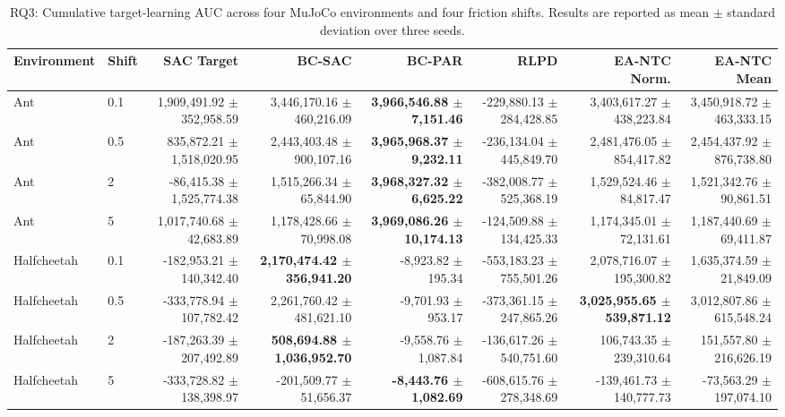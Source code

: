 \begin{table}[htbp]
\centering
\caption{RQ3: Cumulative target-learning AUC across four MuJoCo environments and four friction shifts. Results are reported as mean $\pm$ standard deviation over three seeds.}
\label{tab:rq3_absolute_auc}
\scriptsize
\setlength{\tabcolsep}{3pt}
\renewcommand{\arraystretch}{1.15}
\begin{adjustbox}{max width=\textwidth}
\begin{tabular}{llrrrrrr}
\toprule
\textbf{Environment} & \textbf{Shift} & \textbf{SAC Target} & \textbf{BC-SAC} & \textbf{BC-PAR} & \textbf{RLPD} & \textbf{EA-NTC Norm.} & \textbf{EA-NTC Mean} \\
\midrule
Ant & 0.1 & 1,909,491.92 $\pm$ 352,958.59 & 3,446,170.16 $\pm$ 460,216.09 & \textbf{3,966,546.88 $\pm$ 7,151.46} & -229,880.13 $\pm$ 284,428.85 & 3,403,617.27 $\pm$ 438,223.84 & 3,450,918.72 $\pm$ 463,333.15 \\
Ant & 0.5 & 835,872.21 $\pm$ 1,518,020.95 & 2,443,403.48 $\pm$ 900,107.16 & \textbf{3,965,968.37 $\pm$ 9,232.11} & -236,134.04 $\pm$ 445,849.70 & 2,481,476.05 $\pm$ 854,417.82 & 2,454,437.92 $\pm$ 876,738.80 \\
Ant & 2 & -86,415.38 $\pm$ 1,525,774.38 & 1,515,266.34 $\pm$ 65,844.90 & \textbf{3,968,327.32 $\pm$ 6,625.22} & -382,008.77 $\pm$ 525,368.19 & 1,529,524.46 $\pm$ 84,817.47 & 1,521,342.76 $\pm$ 90,861.51 \\
Ant & 5 & 1,017,740.68 $\pm$ 42,683.89 & 1,178,428.66 $\pm$ 70,998.08 & \textbf{3,969,086.26 $\pm$ 10,174.13} & -124,509.88 $\pm$ 134,425.33 & 1,174,345.01 $\pm$ 72,131.61 & 1,187,440.69 $\pm$ 69,411.87 \\
\midrule
Halfcheetah & 0.1 & -182,953.21 $\pm$ 140,342.40 & \textbf{2,170,474.42 $\pm$ 356,941.20} & -8,923.82 $\pm$ 195.34 & -553,183.23 $\pm$ 755,501.26 & 2,078,716.07 $\pm$ 195,300.82 & 1,635,374.59 $\pm$ 21,849.09 \\
Halfcheetah & 0.5 & -333,778.94 $\pm$ 107,782.42 & 2,261,760.42 $\pm$ 481,621.10 & -9,701.93 $\pm$ 953.17 & -373,361.15 $\pm$ 247,865.26 & \textbf{3,025,955.65 $\pm$ 539,871.12} & 3,012,807.86 $\pm$ 615,548.24 \\
Halfcheetah & 2 & -187,263.39 $\pm$ 207,492.89 & \textbf{508,694.88 $\pm$ 1,036,952.70} & -9,558.76 $\pm$ 1,087.84 & -136,617.26 $\pm$ 540,751.60 & 106,743.35 $\pm$ 239,310.64 & 151,557.80 $\pm$ 216,626.19 \\
Halfcheetah & 5 & -333,728.82 $\pm$ 138,398.97 & -201,509.77 $\pm$ 51,656.37 & \textbf{-8,443.76 $\pm$ 1,082.69} & -608,615.76 $\pm$ 278,348.69 & -139,461.73 $\pm$ 140,777.73 & -73,563.29 $\pm$ 197,074.10 \\

\end{tabular}
\end{adjustbox}
\end{table}
